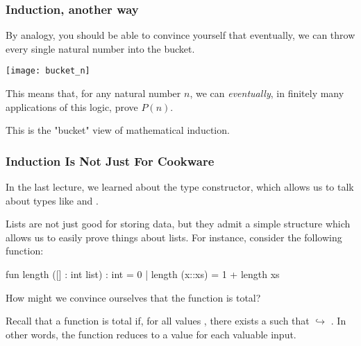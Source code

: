 \documentclass[aspectratio=169]{beamer}
\begin{document}
\begin{frame}[fragile]
  \frametitle{Induction, another way}

  By analogy, you should be able to convince yourself that eventually, we can throw every single
  natural number into the bucket.

  \pause
  \begin{center} \texttt{[image: bucket\_n]} \end{center}

  This means that, for any natural number $n$, we can \textit{eventually}, in finitely many
  applications of this logic, prove $P(n)$.

  \pause
  \vspace{\fill}

  This is the "bucket" view of mathematical induction.
\end{frame}

\begin{frame}[fragile]
  \frametitle{Induction Is Not Just For Cookware}

  In the last lecture, we learned about the  type constructor, which allows us
  to talk about types like  and .

  \pause
  \vspace{\fill}

  Lists are not just good for storing data, but they admit a simple structure which allows 
  us to easily prove things about lists. For instance, consider the following function:

  \pause
  \begin{codeblock}
    fun length ([] : int list) : int = 0
      | length (x::xs) = 1 + length xs
  \end{codeblock}

  How might we convince ourselves that the  function is total?

  \pause
  \vspace{\fill}

  Recall that a function  is total if, for all values , there exists a
   such that  $\hookrightarrow$ . In other words, the function 
  reduces to a value for each valuable input.
\end{frame}
\end{document}

